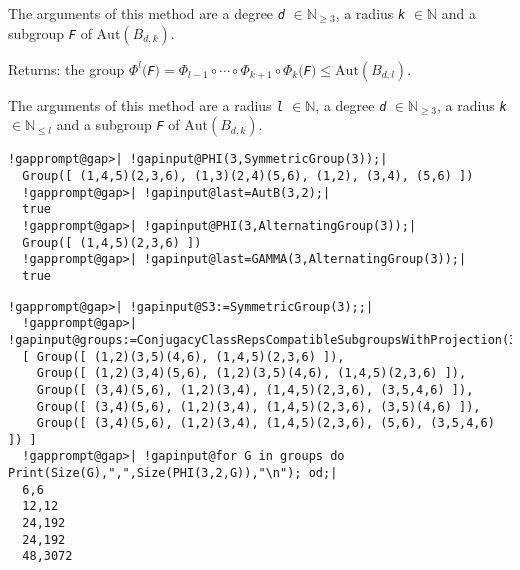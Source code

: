 \documentclass[a4paper,11pt]{report}
\begin{document}
{{{\begin{description}
 The arguments of this method are a degree \mbox{\texttt{\mdseries\slshape d}} $\in\mathbb{N}_{\ge 3}$, a radius \mbox{\texttt{\mdseries\slshape k}} $\in\mathbb{N}$ and a subgroup \mbox{\texttt{\mdseries\slshape F}} of $\mathrm{Aut}(B_{d,k})$. 
\item[{for the arguments \mbox{\texttt{\mdseries\slshape l}}, \mbox{\texttt{\mdseries\slshape d}}, \mbox{\texttt{\mdseries\slshape k}}, \mbox{\texttt{\mdseries\slshape F}}}]  Returns: the group $\Phi^{l}($\mbox{\texttt{\mdseries\slshape F}}$)=\Phi_{l-1}\circ\cdots\circ\Phi_{k+1}\circ\Phi_{k}($\mbox{\texttt{\mdseries\slshape F}}$)\le\mathrm{Aut}(B_{d,l})$. 

 The arguments of this method are a radius \mbox{\texttt{\mdseries\slshape l}} $\in\mathbb{N}$, a degree \mbox{\texttt{\mdseries\slshape d}} $\in\mathbb{N}_{\ge 3}$, a radius \mbox{\texttt{\mdseries\slshape k}} $\in\mathbb{N}_{\le l}$ and a subgroup \mbox{\texttt{\mdseries\slshape F}} of $\mathrm{Aut}(B_{d,k})$. 
\end{description}
 

 }

 

 
\begin{Verbatim}[commandchars=!@|,fontsize=\small,frame=single,label=Example]
  !gapprompt@gap>| !gapinput@PHI(3,SymmetricGroup(3));|
  Group([ (1,4,5)(2,3,6), (1,3)(2,4)(5,6), (1,2), (3,4), (5,6) ])
  !gapprompt@gap>| !gapinput@last=AutB(3,2);|
  true
  !gapprompt@gap>| !gapinput@PHI(3,AlternatingGroup(3));|
  Group([ (1,4,5)(2,3,6) ])
  !gapprompt@gap>| !gapinput@last=GAMMA(3,AlternatingGroup(3));|
  true
\end{Verbatim}
 

 
\begin{Verbatim}[commandchars=!@|,fontsize=\small,frame=single,label=Example]
  !gapprompt@gap>| !gapinput@S3:=SymmetricGroup(3);;|
  !gapprompt@gap>| !gapinput@groups:=ConjugacyClassRepsCompatibleSubgroupsWithProjection(3,2,1,S3);|
  [ Group([ (1,2)(3,5)(4,6), (1,4,5)(2,3,6) ]), 
    Group([ (1,2)(3,4)(5,6), (1,2)(3,5)(4,6), (1,4,5)(2,3,6) ]), 
    Group([ (3,4)(5,6), (1,2)(3,4), (1,4,5)(2,3,6), (3,5,4,6) ]), 
    Group([ (3,4)(5,6), (1,2)(3,4), (1,4,5)(2,3,6), (3,5)(4,6) ]), 
    Group([ (3,4)(5,6), (1,2)(3,4), (1,4,5)(2,3,6), (5,6), (3,5,4,6) ]) ]
  !gapprompt@gap>| !gapinput@for G in groups do Print(Size(G),",",Size(PHI(3,2,G)),"\n"); od;|
  6,6
  12,12
  24,192
  24,192
  48,3072
\end{Verbatim}
 

}}
\end{document}
